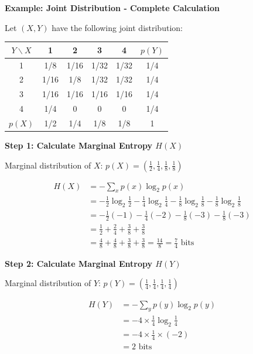 \documentclass[11pt,a4paper]{book}
\newcounter{qna}[chapter]
\renewcommand{\theqna}{\thechapter.\arabic{qna}}
\newenvironment{questionanswerbox}{
    \refstepcounter{qna}%
    \begin{tcolorbox}[
        enhanced,
        breakable,
        colback=softlavender!10,
        colframe=softlavender!200,
        title={Example~\theqna}, %
        fonttitle=\bfseries,
        coltitle=white,
        colbacktitle=softlavender!200,
        sharp corners,
        boxrule=1pt,
        left=8pt,
        right=8pt,
        top=6pt,
        bottom=6pt
    ]
}{
    \end{tcolorbox}
}
\begin{document}
\begin{questionanswerbox}
    \textbf{Example: Joint Distribution - Complete Calculation}
    
    Let \((X,Y)\) have the following joint distribution:
    
    \begin{center}
    \begin{tabular}{c|cccc|c}
    \(Y \backslash X\) & 1 & 2 & 3 & 4 & \(p(Y)\)\\ \hline
    1 & 1/8 & 1/16 & 1/32 & 1/32 & 1/4\\
    2 & 1/16 & 1/8 & 1/32 & 1/32 & 1/4\\
    3 & 1/16 & 1/16 & 1/16 & 1/16 & 1/4\\
    4 & 1/4 & 0 & 0 & 0 & 1/4\\ \hline
    \(p(X)\) & 1/2 & 1/4 & 1/8 & 1/8 & 1
    \end{tabular}
    \end{center}
    
    \textbf{Step 1: Calculate Marginal Entropy \(H(X)\)}
    
    Marginal distribution of \(X\): \(p(X) = \left(\frac{1}{2}, \frac{1}{4}, \frac{1}{8}, \frac{1}{8}\right)\)
    
    \begin{align*}
    H(X) &= -\sum_{x} p(x) \log_2 p(x) \\
    &= -\frac{1}{2}\log_2 \frac{1}{2} - \frac{1}{4}\log_2 \frac{1}{4} - \frac{1}{8}\log_2 \frac{1}{8} - \frac{1}{8}\log_2 \frac{1}{8} \\
    &= -\frac{1}{2}(-1) - \frac{1}{4}(-2) - \frac{1}{8}(-3) - \frac{1}{8}(-3) \\
    &= \frac{1}{2} + \frac{2}{4} + \frac{3}{8} + \frac{3}{8} \\
    &= \frac{4}{8} + \frac{4}{8} + \frac{3}{8} + \frac{3}{8} = \frac{14}{8} = \frac{7}{4} \text{ bits}
    \end{align*}
    
    \textbf{Step 2: Calculate Marginal Entropy \(H(Y)\)}
    
    Marginal distribution of \(Y\): \(p(Y) = \left(\frac{1}{4}, \frac{1}{4}, \frac{1}{4}, \frac{1}{4}\right)\)
    
    \begin{align*}
    H(Y) &= -\sum_{y} p(y) \log_2 p(y) \\
    &= -4 \times \frac{1}{4}\log_2 \frac{1}{4} \\
    &= -4 \times \frac{1}{4} \times (-2) \\
    &= 2 \text{ bits}
    \end{align*}
    

\end{questionanswerbox}
\end{document}
